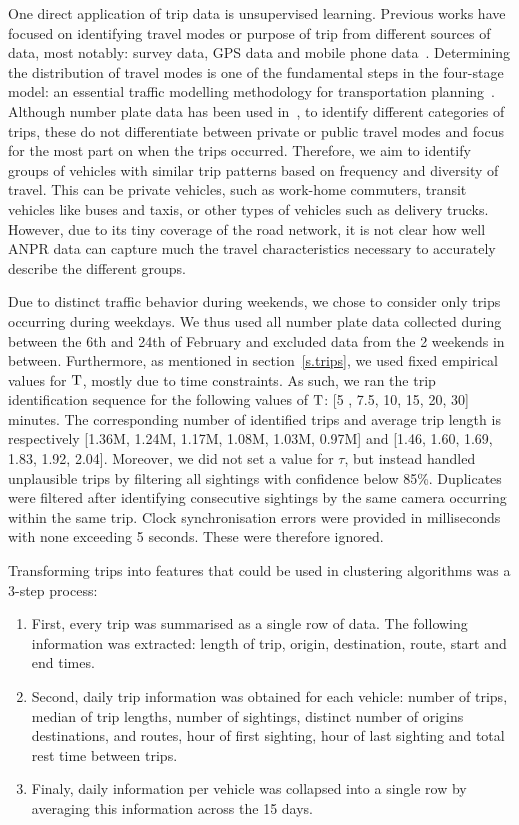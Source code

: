 One direct application of trip data is unsupervised learning. Previous works have focused on identifying travel modes or purpose of trip from different sources of data, most notably: survey data, GPS data and mobile phone data~\cite{ODMobileData, ClusteringGPS}. Determining the distribution of travel modes is one of the fundamental steps in the four-stage model: an essential traffic modelling methodology for transportation planning~\cite{FourStepModel}. Although number plate data has been used in~\cite{Clustering}, to identify different categories of trips, these do not differentiate between private or public travel modes and focus for the most part on when the trips occurred. Therefore, we aim to identify groups of vehicles with similar trip patterns based on frequency and diversity of travel. This can be private vehicles, such as work-home commuters, transit vehicles like buses and taxis, or other types of vehicles such as delivery trucks.
However, due to its tiny coverage of the road network, it is not clear how well ANPR data can capture much the travel characteristics necessary to accurately describe the different groups.

Due to distinct traffic behavior during weekends, we chose to consider only trips occurring during weekdays. We thus used all number plate data collected during between the 6th and 24th of February and excluded data from the 2 weekends in between. Furthermore, as mentioned in section~\ref{s.trips}, we used fixed empirical values for $\mathrm{T}$, mostly due to time constraints. As such, we ran the trip identification sequence for the following values of $\mathrm{T}$: [5 , 7.5, 10, 15, 20, 30] minutes. The corresponding number of identified trips and average trip length is respectively [1.36M, 1.24M, 1.17M, 1.08M, 1.03M, 0.97M] and [1.46, 1.60, 1.69, 1.83, 1.92, 2.04]. Moreover, we did not set a value for $\tau$, but instead handled unplausible trips by filtering all sightings with confidence below 85\%. Duplicates were filtered after identifying consecutive sightings by the same camera occurring within the same trip. Clock synchronisation errors were provided in milliseconds with none exceeding 5 seconds. These were therefore ignored.

Transforming trips into features that could be used in clustering algorithms was a 3-step process:
\begin{enumerate}
  \item First, every trip was summarised as a single row of data. The following information was extracted: length of trip, origin, destination, route, start and end times.
  \item Second, daily trip information was obtained for each vehicle: number of trips, median of trip lengths, number of sightings, distinct number of origins destinations, and routes, hour of first sighting, hour of last sighting and total rest time between trips.
  \item Finaly, daily information per vehicle was collapsed into a single row by averaging this information across the 15 days.
\end{enumerate}

